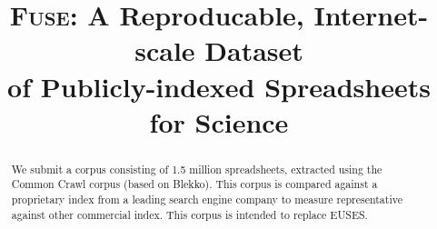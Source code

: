 \documentclass[conference]{IEEEtran}
\begin{document}
%
\title{\textsc{Fuse}: A Reproducable, Internet-scale Dataset\\of Publicly-indexed Spreadsheets for Science}

\author{
\and
{}
\and
{}
}



\maketitle


\begin{abstract}
We submit a corpus consisting of 1.5 million spreadsheets, extracted using the Common Crawl corpus (based on Blekko). This corpus is compared against a proprietary index from a leading search engine company to measure representative against other commercial index. This corpus is intended to replace EUSES.
\end{abstract}

\end{document}
